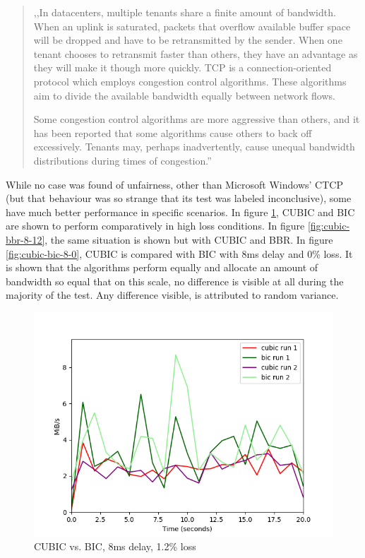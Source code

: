 \documentclass{article}
\begin{document}
\begin{quote}
	,,In datacenters, multiple tenants share a finite amount of bandwidth. When an uplink
	is saturated, packets that overflow available buffer space will be dropped and have to
	be retransmitted by the sender. When one tenant chooses to retransmit faster than
	others, they have an advantage as they will make it though more quickly. TCP is
	a connection-oriented protocol which employs congestion control algorithms. These
	algorithms aim to divide the available bandwidth equally between network flows.

	Some congestion control algorithms are more aggressive than others, and it has been
	reported that some algorithms cause others to back off excessively. Tenants may,
	perhaps inadvertently, cause unequal bandwidth distributions during times of congestion.''
\end{quote}

While no case was found of unfairness, other than Microsoft Windows' CTCP (but
that behaviour was so strange that its test was labeled inconclusive), some
have much better performance in specific scenarios. In figure
\ref{fig:cubic-bic-8-12}, CUBIC and BIC are shown to perform comparatively in
high loss conditions. In figure \ref{fig:cubic-bbr-8-12}, the same situation is
shown but with CUBIC and BBR. In figure \ref{fig:cubic-bic-8-0}, CUBIC is
compared with BIC with 8ms delay and 0\% loss. It is shown that the algorithms
perform equally and allocate an amount of bandwidth so equal that on this
scale, no difference is visible at all during the majority of the test. Any
difference visible, is attributed to random variance.

\begin{figure}[H]
	\includegraphics{cubic_vs_bic_8_12.png}
	\caption{CUBIC vs. BIC, 8ms delay, 1.2\% loss}
	\label{fig:cubic-bic-8-12}
\end{figure}
\end{document}
